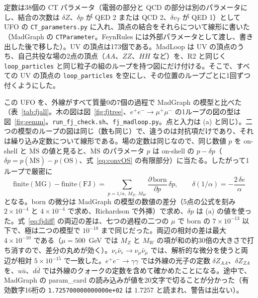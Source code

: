 \documentclass[a4paper,10pt]{ltjsarticle}
\newcommand{\MSbar}{\overline{\mathrm{MS}}}
\begin{document}
定数は38個の CT パラメータ（電弱の部分と QCD の部分は別のパラメータにし、結合の次数は $\delta Z$、$\delta p$ が QED 2 または QCD 2、$\delta v_T$ が QED 1）として UFO の \texttt{CT\_parameters.py} に入れ、頂点の結合をそれらについて線形に書いた（MadGraph の \texttt{CTParameter}。FeynRules には外部パラメータとして渡し、書き出した後で移した）。UV の頂点は173個である。MadLoop は UV の頂点のうち、自己共役な場の2点の頂点（$AA$、$ZZ$、$HH$ など）を、R2 と同じく \texttt{loop\_particles} と同じ粒子の組のループを持つ図にだけ付ける。そこで、すべての UV の頂点の \texttt{loop\_particles} を空にし、その位置のループごとに1回ずつ付くようにした。

この UFO を、外線がすべて質量0の7個の過程で MadGraph の模型と比べた（表~\ref{tab:fjall}。木の図は図~\ref{fig:fjtree}、$e^+e^-\to\mu^+\mu^-$ の1ループの図の型は図~\ref{fig:eemm}。\texttt{run\_fj\_check.sh}、\texttt{fj\_madloop.py}。点と入力は (a) と同じ）。二つの模型のループの図は同じ（数も同じ）で、違うのは対抗項だけであり、それは繰り込み定数について線形である。場の定数は同じなので、同じ数値 $p$ を on-shell と $\MSbar$ の値と見ると、$\MSbar$ のパラメータ $p$ は on-shell の $p-\delta p$（$\delta p=p(\MSbar)-p(\mathrm{OS})$、式~\eqref{eq:convOS} の有限部分）に当たる。したがって1ループで厳密に
\begin{equation}
\mathrm{finite}(\mathrm{MG})-\mathrm{finite}(\mathrm{FJ})=\sum_{p=1/\alpha,\,M_Z,\,M_W}\frac{\partial\,\mathrm{born}}{\partial p}\,\delta p,\qquad\delta(1/\alpha)=-\frac{2\,\delta e}{\alpha}
\label{eq:fjdiff}
\end{equation}
となる。born の微分は MadGraph の模型の数値の差分（5点の公式を刻み $2\times10^{-4}$ と $4\times10^{-4}$ で求め、Richardson で外挿）で求め、$\delta p$ は (a) の値を使った。式~\eqref{eq:fjdiff} の両辺の差は、七つの過程の二つの $\mu$ で born の $7\times10^{-13}$ 以下で、極は二つの模型で $10^{-18}$ まで同じだった。両辺の相対の差は最大 $4\times10^{-10}$ である（$\mu=500$~GeV では $M_Z$ と $M_W$ の項が和の約30倍の大きさで打ち消すので、差分の丸めが効く）。$\nu_e\bar\nu_e\to\nu_\mu\bar\nu_\mu$ では、解析的な微分を使うと両辺が相対 $5\times10^{-15}$ で一致した。$e^+e^-\to\gamma\gamma$ では外線の光子の定数 $\delta Z_{AA}$、$\delta Z_{ZA}$ を、$u\bar u$、$d\bar d$ では外線のクォークの定数を含めて確かめたことになる。途中で、MadGraph の param\_card の読み込みが値を20文字で切ることが分かった（有効数字16桁の \texttt{1.725700000000000e+02} は $1.7257$ と読まれ、警告は出ない）。
\end{document}
